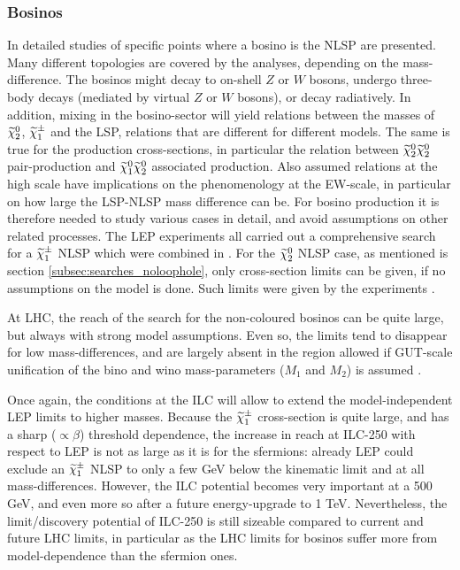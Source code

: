 \subsubsection{Bosinos}
\label{subsec:searches_bosinos}

In \cite{Berggren:2015qua,Berggren:2013vfa,Baer:2016new,Chera:402736}
detailed studies of specific points where a bosino is the NLSP
are presented.
Many different topologies are covered by the analyses,
depending on the mass-difference.
The bosinos might decay to on-shell $Z$ or $W$ bosons,
undergo three-body decays (mediated by virtual
$Z$ or $W$ bosons), or decay radiatively.
In addition,
mixing in the bosino-sector will yield relations between the masses
of $\mbox{$ \widetilde{\chi}^0_2 $}$, $\mbox{$ \widetilde{\chi}^{\pm}_1 $}$ and the LSP, relations that are different
for different models.
The same is true for the production cross-sections,
in particular the relation between $\mbox{$ \widetilde{\chi}^0_2 $}\mbox{$ \widetilde{\chi}^0_2 $}$
pair-production and
$\mbox{$ \widetilde{\chi}^0_1 $}\mbox{$ \widetilde{\chi}^0_2 $}$ associated production.
Also assumed relations at the high scale have implications on
the phenomenology at the EW-scale,
in particular on how large the LSP-NLSP mass difference can be.
For bosino production it is therefore needed to study
various cases in detail,
and avoid assumptions on other related processes.
The LEP experiments all carried out a comprehensive
search for a $\mbox{$ \widetilde{\chi}^{\pm}_1 $}$ NLSP which were combined in \cite{LEPSUSYWG/02-04.1}.
For the   $\mbox{$ \widetilde{\chi}^0_2 $}$ NLSP case,
as mentioned is section \ref{subsec:searches_noloophole},
only cross-section limits can be given,
if no assumptions on the model is done.
Such limits were given by the experiments \cite{Abdallah:2003xe,Acciarri:1999km,Abbiendi:2003sc}.

At LHC, the reach of the search for the non-coloured bosinos
can be quite large, but always with strong model assumptions.
Even so, the limits tend to disappear for low mass-differences,
and are largely absent in the region allowed if GUT-scale unification
of the bino and wino mass-parameters ($M_1$ and $M_2$) is assumed
\cite{Aaboud:2018jiw,Aaboud:2017leg,Sirunyan:2018ubx}.

Once again, the conditions at the ILC will allow to extend the
model-independent LEP limits to higher masses.
Because the $\mbox{$ \widetilde{\chi}^{\pm}_1 $}$ cross-section is quite large, and has
a sharp ($\propto \beta$) threshold dependence,
the increase in reach at ILC-250 with respect to LEP is
not as large as it is for the sfermions: already LEP could
exclude  an $\mbox{$ \widetilde{\chi}^{\pm}_1 $}$ NLSP to only a few GeV below the kinematic limit
and at all mass-differences.
However,
the ILC potential
becomes very important at a 500 GeV,
and even more so after a future energy-upgrade to 1 TeV. 
Nevertheless,
the limit/discovery potential of ILC-250 is still sizeable
compared to current and future LHC limits,
in particular as the LHC limits for bosinos suffer
more from model-dependence than the sfermion ones.

